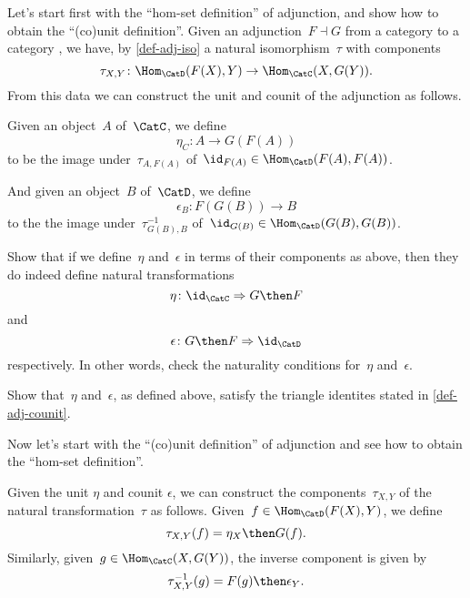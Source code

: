 Let's start first with the ``hom-set definition'' of adjunction, and show how to obtain the ``(co)unit definition''.
Given an adjunction~$F \dashv G$ from a category \CatC to a category \CatD, we have, by \cref{def-adj-iso} a natural isomorphism~$\tau$ with components
\begin{equation*}
    \tau_{X,Y} \colon \Hom_{\CatD}(F(X) ,Y ) \to \Hom_{\CatC}(X , G(Y) ).
\end{equation*}
From this data we can construct the unit and counit of the adjunction as follows.

Given an object~$A$ of~$\CatC$, we define
\begin{equation*}
    \eta_C \colon A \to G(F(A))
\end{equation*}
to be the image under~$\tau_{A, F(A)}$ of~$\id_{F(A)} \in \Hom_{\CatD}(F (A) , F(A) )$.

And given an object~$B$ of~$\CatD$, we define
\begin{equation*}
    \epsilon_B \colon F(G(B)) \to B
\end{equation*}
to the the image under~$\tau_{G(B), B}^{-1}$ of~$\id_{G(B)} \in \Hom_{\CatD}(G(B), G(B))$.

\begin{exercise}
    Show that if we define~$\eta$ and~$\epsilon$ in terms of their components as above, then they do indeed define natural transformations
    \begin{equation*}
        \eta\colon \id_{\CatC} \Rightarrow G\then F
    \end{equation*}
    and
    \begin{equation*}
        \epsilon\colon G \then F \Rightarrow \id_{\CatD}
    \end{equation*}
    respectively. In other words, check the naturality conditions for~$\eta$ and~$\epsilon$.
\end{exercise}

\begin{exercise}
    Show that~$\eta$ and~$\epsilon$, as defined above, satisfy the triangle identites stated in \cref{def-adj-counit}.
\end{exercise}

Now let's start with the ``(co)unit definition'' of adjunction and see how to obtain the ``hom-set definition''.

Given the unit $\eta$ and counit $\epsilon$, we can construct the components~$\tau_{X,Y}$ of the natural transformation~$\tau$ as follows. Given~$f \in \Hom_{\CatD}(F(X),Y)$, we define
\begin{equation*}
    \tau_{X,Y}(f) = \eta_X \then G(f).
\end{equation*}
Similarly, given~$g \in \Hom_{\CatC}(X,G(Y))$, the inverse component is given by
\begin{equation*}
    \tau_{X,Y}^{-1}(g) = F(g) \then \epsilon_Y.
\end{equation*}

